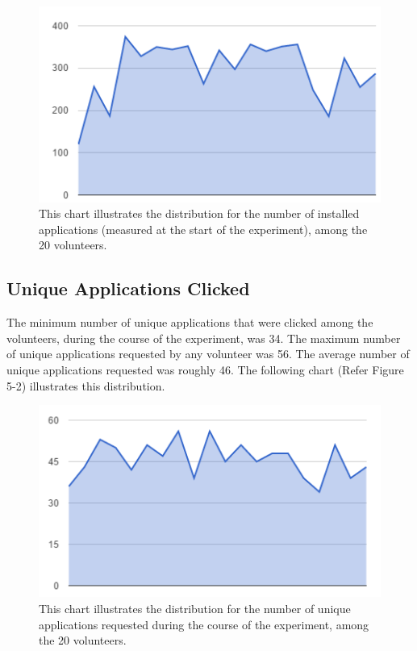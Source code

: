 \documentclass[12pt]{uthesis-v12}  %
\begin{document}
				\begin{figure}[h]
					\centering
					\includegraphics[width = 130mm]{images/totalApps.png}
					\caption[Distribution of Total Installed Applications]{This chart illustrates the distribution for the number of installed applications (measured at the start of the experiment), among the 20 volunteers.}
				\end{figure}
				
			\subsection{Unique Applications Clicked}
				The minimum number of unique applications that were clicked among the volunteers, during the course of the experiment, was 34. The maximum number of unique applications requested by any volunteer was 56. The average number of unique applications requested was roughly 46. The following chart (Refer Figure 5-2) illustrates this distribution.
				
				\begin{figure}[h]
					\centering
					\includegraphics[width = 130mm]{images/uniqueApps.png}
					\caption[Distribution of Unique Applications Requested]{This chart illustrates the distribution for the number of unique applications requested during the course of the experiment, among the 20 volunteers.}
				\end{figure}
				
\end{document}
